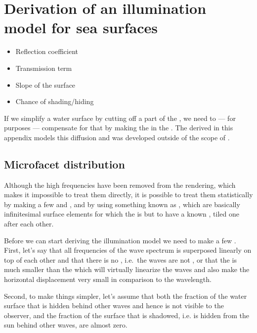 \chapter{Derivation of an illumination model for sea surfaces}
\label{chap:illumination_model_derivation}

\begin{itemize}
\item Reflection coefficient
\item Transmission term
\item Slope of the surface
\item Chance of shading/hiding
\end{itemize}

\HRule

{
If we simplify a water surface by cutting off a part of the , we need to --- for \rendering purposes --- compensate for that by making the  in the  . The  derived in this appendix models this diffusion and was developed outside of the scope of \thismasterthesiswork.

\section{Microfacet distribution}

Although the high frequencies have been removed from the rendering, which makes it impossible to treat them directly, it is possible to treat them statistically by making a few \assumptions and \approximations, and by using something known as \microfacets, which are basically infinitesimal surface elements for which the  is \stochastic but \assumed to have a known , tiled one after each other.

Before we can start deriving the illumination model we need to make a few \assumptions. First, let's say that all frequencies of the wave spectrum is superposed linearly on top of each other and that there is no , i.e.\ the waves are not , or that the  is much smaller than the \wavelength which will virtually linearize the waves and also make the horizontal displacement very small in comparison to the wavelength.

Second, to make things simpler, let's assume that both the fraction of the water surface that is hidden behind other waves and hence is not visible to the observer, and the fraction of the surface that is shadowed, i.e. is hidden from the sun behind other waves, are almost zero.

}
